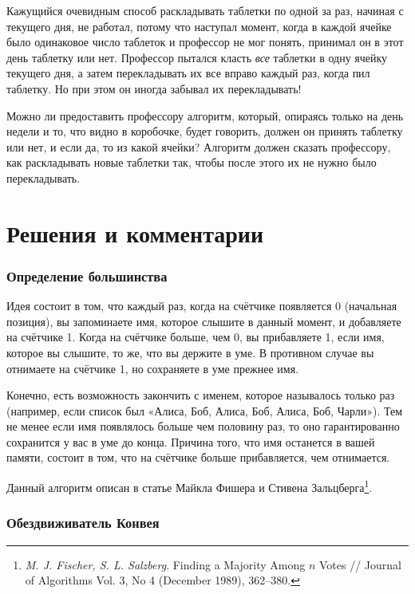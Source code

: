 \documentclass[twoside]{book}
\begin{document}
Кажущийся очевидным способ раскладывать таблетки по одной за раз, начиная с текущего дня, не работал, потому что наступал момент, когда в каждой ячейке было одинаковое число таблеток и профессор не мог понять, принимал он в этот день таблетку или нет.
Профессор пытался класть \emph{все} таблетки в одну ячейку текущего дня, а затем перекладывать их все вправо каждый раз, когда пил таблетку.
Но при этом он иногда забывал их перекладывать!

Можно ли предоставить профессору алгоритм, который, опираясь только на день недели и то, что видно в коробочке,  будет говорить, должен он принять таблетку или нет, и если да, то из какой ячейки?
Алгоритм должен сказать профессору, как раскладывать новые таблетки
так, чтобы после этого их не нужно было перекладывать.


\section*{Решения и комментарии}

\subsubsection*{Определение большинства}%

Идея состоит в том, что каждый раз, когда на счётчике появляется 0 (начальная позиция), 
вы запоминаете имя, которое слышите в данный момент, и добавляете на счётчике 1.
Когда на счётчике больше, чем 0, вы прибавляете 1, если имя, которое вы слышите, то же, что вы держите в уме.
В противном случае вы отнимаете на счётчике 1, но сохраняете в уме прежнее имя.

Конечно, есть возможность закончить с именем, которое называлось только раз (например, если список был «Алиса, Боб, Алиса, Боб, Алиса, Боб, Чарли»).
Тем не менее если имя появлялось больше чем половину раз, то оно гарантированно сохранится у вас в уме до конца.
Причина того, что имя останется в вашей памяти, состоит в том, что на счётчике больше прибавляется, чем отнимается.

Данный алгоритм описан в статье Майкла Фишера и Стивена Зальцберга\footnote{\emph{M. J. Fischer, S. L. Salzberg}. Finding a Majority Among $n$ Votes /\!/ {Journal of Algorithms} Vol. 3, No 4 (December 1989),  362--380.}.

\subsubsection*{Обездвиживатель Конвея}%
\end{document}
